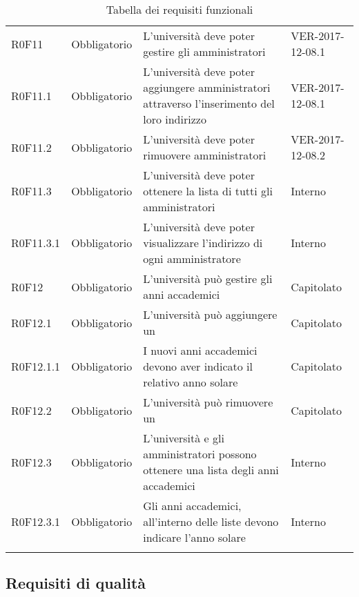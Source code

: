 \documentclass[AnalisiDeiRequisiti.tex]{subfiles}
\begin{document}
\begin{longtable}[H]{p{2.6cm}p{2.5cm}p{5cm}p{2cm}}
	R0F11 & Obbligatorio & L'università deve poter gestire gli amministratori & VER-2017-12-08.1 \\
	R0F11.1 & Obbligatorio & L'università deve poter aggiungere amministratori attraverso l'inserimento del loro indirizzo & VER-2017-12-08.1 \\
	R0F11.2 & Obbligatorio & L'università deve poter rimuovere amministratori & VER-2017-12-08.2 \\
	R0F11.3 & Obbligatorio & L'università deve poter ottenere la lista di tutti gli amministratori & Interno \\
	R0F11.3.1 & Obbligatorio & L'università deve poter visualizzare l'indirizzo di ogni amministratore & Interno \\
	R0F12 & Obbligatorio & L'università può gestire gli anni accademici & Capitolato \\
	R0F12.1 & Obbligatorio & L'università può aggiungere un \citGloss{anno accademico} & Capitolato \\
	R0F12.1.1 & Obbligatorio & I nuovi anni accademici devono aver indicato il relativo anno solare & Capitolato \\
	R0F12.2 & Obbligatorio & L'università può rimuovere un \citGloss{anno accademico} & Capitolato \\
	R0F12.3 & Obbligatorio & L'università e gli amministratori possono ottenere una lista degli anni accademici & Interno \\
	R0F12.3.1 & Obbligatorio & Gli anni accademici, all'interno delle liste devono indicare l'anno solare & Interno \\
	\hiderowcolors
	\caption{Tabella dei requisiti funzionali}
\end{longtable}

\subsection{Requisiti di qualità}
\end{document}
